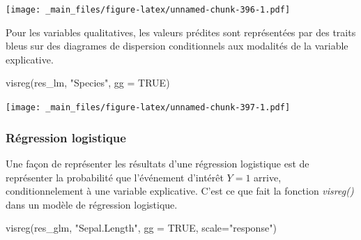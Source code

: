 \documentclass[
]{book}
\newenvironment{Shaded}{\begin{snugshade}}{\end{snugshade}}
\newcommand{\AttributeTok}[1]{\textcolor[rgb]{0.77,0.63,0.00}{#1}}
\newcommand{\ConstantTok}[1]{\textcolor[rgb]{0.00,0.00,0.00}{#1}}
\newcommand{\DecValTok}[1]{\textcolor[rgb]{0.00,0.00,0.81}{#1}}
\newcommand{\FunctionTok}[1]{\textcolor[rgb]{0.00,0.00,0.00}{#1}}
\newcommand{\NormalTok}[1]{#1}
\newcommand{\OtherTok}[1]{\textcolor[rgb]{0.56,0.35,0.01}{#1}}
\newcommand{\SpecialCharTok}[1]{\textcolor[rgb]{0.00,0.00,0.00}{#1}}
\newcommand{\StringTok}[1]{\textcolor[rgb]{0.31,0.60,0.02}{#1}}
\theoremstyle{definition}
\theoremstyle{definition}
\theoremstyle{definition}
\theoremstyle{definition}
\theoremstyle{remark}
\begin{document}
\texttt{[image: \_main\_files/figure-latex/unnamed-chunk-396-1.pdf]}

Pour les variables qualitatives, les valeurs prédites sont représentées par des traits bleus sur des diagrames de dispersion conditionnels aux modalités de la variable explicative.

\begin{Shaded}
\begin{Highlighting}[]
\FunctionTok{visreg}\NormalTok{(res\_lm, }\StringTok{"Species"}\NormalTok{,}
       \AttributeTok{gg =} \ConstantTok{TRUE}\NormalTok{) }
\end{Highlighting}
\end{Shaded}

\texttt{[image: \_main\_files/figure-latex/unnamed-chunk-397-1.pdf]}

\hypertarget{ruxe9gression-logistique}{%
\subsubsection{Régression logistique}\label{ruxe9gression-logistique}}

Une façon de représenter les résultats d'une régression logistique est de représenter la probabilité que l'événement d'intérêt \(Y=1\) arrive, conditionnelement à une variable explicative. C'est ce que fait la fonction \emph{visreg()} dans un modèle de régression logistique.

\begin{Shaded}
\end{Shaded}

\begin{Shaded}
\begin{Highlighting}[]
\FunctionTok{visreg}\NormalTok{(res\_glm, }\StringTok{"Sepal.Length"}\NormalTok{, }
       \AttributeTok{gg =} \ConstantTok{TRUE}\NormalTok{, }
       \AttributeTok{scale=}\StringTok{"response"}\NormalTok{)}
\end{Highlighting}
\end{Shaded}
\end{document}

